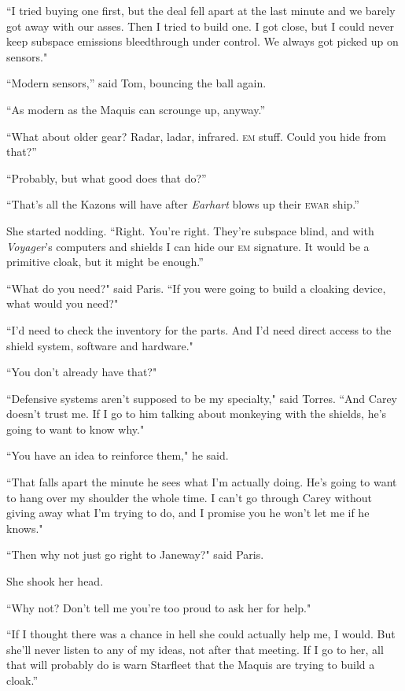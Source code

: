 \documentclass[twoside,letterpaper,12pt]{memoir}
\begin{document}
``I tried buying one first, but the deal fell apart at the last minute and we barely got away with our asses. Then I tried to build one. I got close, but I could never keep subspace emissions bleedthrough under control. We always got picked up on sensors." 

``Modern sensors,” said Tom, bouncing the ball again. 

``As modern as the Maquis can scrounge up, anyway.” 

``What about older gear? Radar, ladar, infrared. \textsc{em} stuff. Could you hide from that?” 

``Probably, but what good does that do?” 

``That’s all the Kazons will have after \textit{Earhart} blows up their \textsc{ewar} ship.” 

She started nodding. ``Right. You’re right. They’re subspace blind, and with \textit{Voyager}’s computers and shields I can hide our \textsc{em} signature. It would be a primitive cloak, but it might be enough.” 

``What do you need?" said Paris. ``If you were going to build a cloaking device, what would you need?" 

``I'd need to check the inventory for the parts. And I'd need direct access to the shield system, software and hardware." 

``You don't already have that?" 

``Defensive systems aren't supposed to be my specialty," said Torres. ``And Carey doesn't trust me. If I go to him talking about monkeying with the shields, he's going to want to know why." 

``You have an idea to reinforce them," he said. 

``That falls apart the minute he sees what I'm actually doing. He's going to want to hang over my shoulder the whole time. I can't go through Carey without giving away what I'm trying to do, and I promise you he won't let me if he knows." 

``Then why not just go right to Janeway?" said Paris. 

She shook her head. 

``Why not? Don't tell me you're too proud to ask her for help." 

``If I thought there was a chance in hell she could actually help me, I would. But she’ll never listen to any of my ideas, not after that meeting. If I go to her, all that will probably do is warn Starfleet that the Maquis are trying to build a cloak.” 
\end{document}
